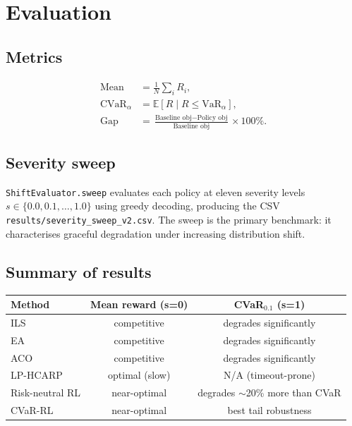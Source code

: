 \documentclass[11pt,a4paper]{article}
\begin{document}
\section{Evaluation}

\subsection{Metrics}

\begin{align}
  \text{Mean} &= \frac{1}{N}\sum_{i}R_i, \\
  \text{CVaR}_\alpha &= \mathbb{E}[R \mid R \leq \text{VaR}_\alpha], \\
  \text{Gap} &= \frac{\text{Baseline obj} - \text{Policy obj}}{\text{Baseline obj}}\times 100\%.
\end{align}

\subsection{Severity sweep}

\texttt{ShiftEvaluator.sweep} evaluates each policy at eleven severity levels
$s \in \{0.0, 0.1, \ldots, 1.0\}$ using greedy decoding, producing the CSV
\texttt{results/severity\_sweep\_v2.csv}. The sweep is the primary benchmark:
it characterises graceful degradation under increasing distribution shift.

\subsection{Summary of results}

\begin{center}
\begin{tabular}{lcc}
\toprule
\textbf{Method} & \textbf{Mean reward (s=0)} & \textbf{CVaR$_{0.1}$ (s=1)} \\
\midrule
ILS             & competitive    & degrades significantly \\
EA              & competitive    & degrades significantly \\
ACO             & competitive    & degrades significantly \\
LP-HCARP        & optimal (slow) & N/A (timeout-prone) \\
Risk-neutral RL & near-optimal   & degrades $\sim$20\% more than CVaR \\
CVaR-RL         & near-optimal   & best tail robustness \\
\bottomrule
\end{tabular}
\end{center}
\end{document}
